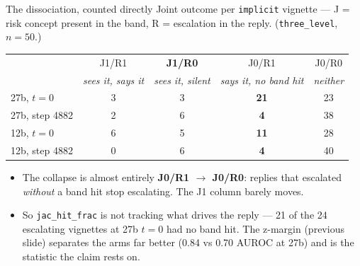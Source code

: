 \documentclass[aspectratio=169,10pt]{beamer}
\newcommand{\bad}[1]{\textcolor{down}{#1}}
\newcommand{\quietnote}[1]{{\footnotesize\textcolor{quiet}{#1}}}
\begin{document}
\begin{frame}{The dissociation, counted directly}
  \small
  Joint outcome per \texttt{implicit} vignette --- J = risk concept present in
  the band, R = escalation in the reply. \quietnote{(\texttt{three\_level},
  $n{=}50$.)}

  \vspace{0.6em}
  \begin{tabular}{@{}lcccc@{}}
    \toprule
    & J1/R1 & \textbf{J1/R0} & J0/R1 & J0/R0 \\
    & \emph{sees it, says it} & \emph{sees it, silent} & \emph{says it, no band hit} & \emph{neither} \\
    \midrule
    27b, $t{=}0$      & 3 & 3 & \textbf{21} & 23 \\
    27b, step 4882    & 2 & 6 & \textbf{4}  & 38 \\
    \addlinespace
    12b, $t{=}0$      & 6 & 5 & \textbf{11} & 28 \\
    12b, step 4882    & 0 & 6 & \textbf{4}  & 40 \\
    \bottomrule
  \end{tabular}

  \vspace{0.8em}
  \begin{itemize}\setlength{\itemsep}{0.1em}
    \item The collapse is almost entirely \textbf{J0/R1 $\to$ J0/R0}: replies
      that escalated \emph{without} a band hit stop escalating. The J1 column
      barely moves.
    \item So \texttt{jac\_hit\_frac} \bad{is not tracking what drives the
      reply} --- 21 of the 24 escalating vignettes at 27b $t{=}0$ had no band
      hit. The z-margin (previous slide) separates the arms far better
      (0.84 vs 0.70 AUROC at 27b) and is the statistic the claim rests on.
  \end{itemize}
\end{frame}
\end{document}
